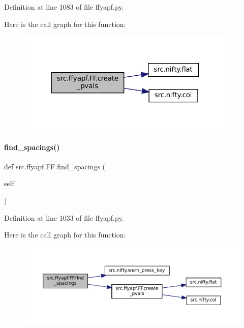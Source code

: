 Definition at line 1083 of file ffyapf.\+py.

Here is the call graph for this function\+:
\nopagebreak
\begin{figure}[H]
\begin{center}
\leavevmode
\includegraphics[width=297pt]{classsrc_1_1ffyapf_1_1FF_a349f2f0f401834f86f9361d8ec32ad0a_cgraph}
\end{center}
\end{figure}
\mbox{\label{classsrc_1_1ffyapf_1_1FF_a32548a67fd22b1016dfa37b4289000e8}} 
\paragraph{\texorpdfstring{find\+\_\+spacings()}{find\_spacings()}}
{\footnotesize\ttfamily def src.\+ffyapf.\+F\+F.\+find\+\_\+spacings (\begin{DoxyParamCaption}\item[{}]{self }\end{DoxyParamCaption})}



Definition at line 1033 of file ffyapf.\+py.

Here is the call graph for this function\+:
\nopagebreak
\begin{figure}[H]
\begin{center}
\leavevmode
\includegraphics[width=350pt]{classsrc_1_1ffyapf_1_1FF_a32548a67fd22b1016dfa37b4289000e8_cgraph}
\end{center}
\end{figure}
\mbox{\label{classsrc_1_1ffyapf_1_1FF_a3e573d0affb542431a364190cf2136b0}} 
